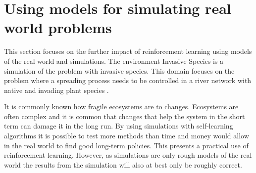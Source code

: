 \section{Using models for simulating real world problems}
\label{sec:ethics_inv_spec}

This section focuses on the further impact of reinforcement learning using models of the real world and simulations. The environment Invasive Species is a simulation of the problem with invasive
species. This domain focuses on the problem where a spreading process needs to be controlled in a
river network with native and invading plant species
\parencite{invasiveSpecis2014:Online}. 

It is commonly known how fragile ecosystems are to changes. Ecosystems are often complex
and it is common that changes that help the system in the short term can damage it in the long
run. By using simulations with self-learning algorithms it is possible to test
more methods than time and money would allow in the real world to find good long-term policies. This 
presents a practical use of reinforcement learning.
However, as simulations are only rough models
of the real world the results from the simulation will also at best only be roughly
correct.

